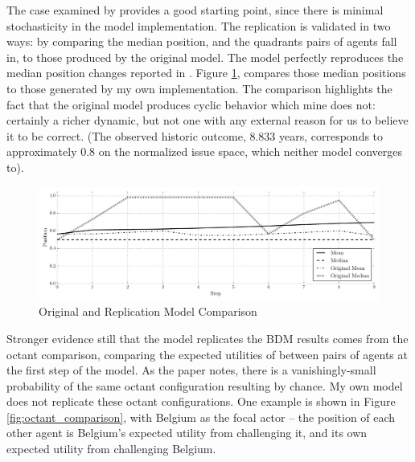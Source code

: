 The case examined by \citet{scholz_2011} provides a good starting point, since there is minimal stochasticity in the model implementation. The \citet{scholz_2011} replication is validated in two ways: by comparing the median position, and the quadrants pairs of agents fall in, to those produced by the original model. The \citet{scholz_2011} model perfectly reproduces the median position changes reported in \citet{bdm_1994}. Figure \ref{fig:model_comparison}, compares those median positions to those generated by my own implementation. The comparison highlights the fact that the original model produces cyclic behavior which mine does not: certainly a richer dynamic, but not one with any external reason for us to believe it to be correct. (The observed historic outcome, 8.833 years, corresponds to approximately 0.8 on the normalized issue space, which neither model converges to).

\begin{figure}
  \centering
  \includegraphics[scale=0.5]{BDM_Reproduction/Figures/ModelComparison}
  \caption{Original and Replication Model Comparison}
  \label{fig:model_comparison}

  \figSpace
\end{figure}

Stronger evidence still that the \citet{scholz_2011} model replicates the BDM results comes from the octant comparison, comparing the expected utilities of between pairs of agents at the first step of the model. As the paper notes, there is a vanishingly-small probability of the same octant configuration resulting by chance. My own model does not replicate these octant configurations. One example is shown in Figure \ref{fig:octant_comparison}, with Belgium as the focal actor -- the position of each other agent is Belgium's expected utility from challenging it, and its own expected utility from challenging Belgium.

